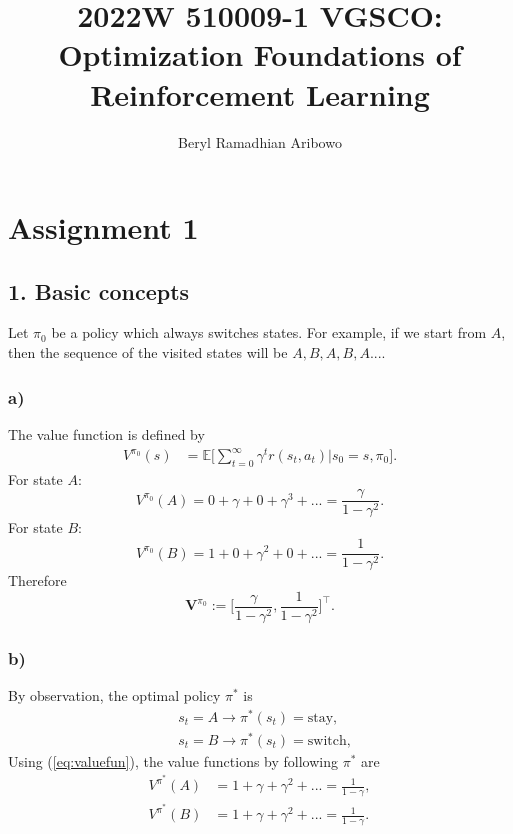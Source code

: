 \documentclass[12pt]{article}
\title{2022W 510009-1 VGSCO: \\ Optimization Foundations of Reinforcement Learning}
\author{Beryl Ramadhian Aribowo}
\begin{document}
\maketitle
\section*{Assignment 1}
\subsection*{1. Basic concepts}
Let $\pi_0$ be a policy which always switches states.
For example, if we start from $A$, then the sequence of the visited states will be $A,B,A,B,A....$
\subsubsection*{a)}
The value function is defined by
\begin{equation}
    \begin{split}
        V^{\pi_0}(s) &= \mathbb{E}\Big[\sum^\infty_{t=0}\gamma^tr(s_t,a_t)|s_0=s, \pi_0\Big].
    \end{split}
    \label{eq:valuefun}
\end{equation}
For state $A$:
\begin{equation*}
    V^{\pi_0}(A) = 0 + \gamma + 0 + \gamma^3 + ... = \frac{\gamma}{1-\gamma^2}.
\end{equation*}
For state $B$:
\begin{equation*}
    V^{\pi_0}(B) = 1 + 0 + \gamma^2 + 0 + ... = \frac{1}{1-\gamma^2}.
\end{equation*}
Therefore
\begin{equation}
    \mathbf{V}^{\pi_0} := \Big[\frac{\gamma}{1-\gamma^2}, \frac{1}{1-\gamma^2}\Big]^\top.
    \label{eq:vpi0}
\end{equation}
\subsubsection*{b)}
By observation, the optimal policy $\pi^*$ is
\begin{equation*}
    \begin{split}
        &s_t=A \rightarrow \pi^*(s_t) = \text{stay}, \\
        &s_t=B \rightarrow \pi^*(s_t) = \text{switch} ,
    \end{split}    
\end{equation*}
Using (\ref{eq:valuefun}), the value functions by following $\pi^*$ are
\begin{equation*}
    \begin{split}
        V^{\pi^*}(A) &= 1 + \gamma + \gamma^2 + ... = \frac{1}{1-\gamma} ,\\
        V^{\pi^*}(B) &= 1 + \gamma + \gamma^2 + ... = \frac{1}{1-\gamma}.
    \end{split}
\end{equation*}
\end{document}
